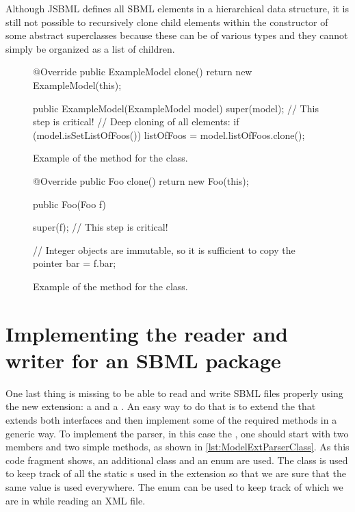 Although JSBML defines all SBML elements in a hierarchical data structure, it
is still not possible to recursively clone child elements within the
constructor of some abstract superclasses because these can be of various
types and they cannot simply be organized as a list of children.

\begin{figure}[htb]
  \begin{example}[numbers=left]
@Override public ExampleModel clone() {
  return new ExampleModel(this);
}

public ExampleModel(ExampleModel model) {
  super(model);  // This step is critical!
  // Deep cloning of all elements:
  if (model.isSetListOfFoos()) {
    listOfFoos = model.listOfFoos.clone();
  }
}\end{example}
 \caption{Example of the  method for the  class.}
 \label{lst:ModelExtClone}
\end{figure}

\begin{figure}[htb]
  \begin{example}[numbers=left]
@Override public Foo clone() {
  return new Foo(this);
}

public Foo(Foo f) {
  super(f);  // This step is critical!

  // Integer objects are immutable, so it is sufficient to copy the pointer
  bar = f.bar;
}\end{example}
  \caption{Example of the  method for the  class.}
  \label{lst:ModelExtCloneFoo}
\end{figure}


\section{Implementing the reader and writer for an SBML package}

One last thing is missing to be able to read and write SBML files properly
using the new extension: a  and a . An easy way to do that is
to extend the \AbstractReaderWriter that extends both interfaces and then implement some of 
the required methods in a generic way. To
implement the parser, in this case the , one should
start with two members and two simple methods, as shown in
\vref{lst:ModelExtParserClass}. As this code fragment shows, an additional class
 and an enum  are used. The class 
is used to keep track of all the static \String{}s used in the extension so that we are sure 
that the same value is used everywhere. The enum   can be used to keep
track of which  we are in while reading an XML file.


